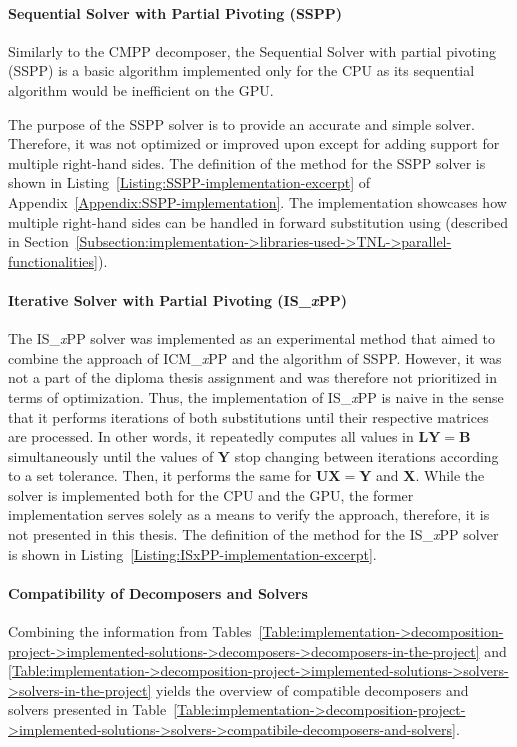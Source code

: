 \paragraph{Sequential Solver with Partial Pivoting (SSPP)}\label{Paragraph:implementation->decomposition-project->implemented-solutions->solvers->SSPP}
Similarly to the CMPP decomposer, the Sequential Solver with partial pivoting (SSPP) is a basic algorithm implemented only for the CPU as its sequential algorithm would be inefficient on the GPU.

The purpose of the SSPP solver is to provide an accurate and simple solver.
Therefore, it was not optimized or improved upon except for adding support for multiple right-hand sides.
The definition of the  method for the SSPP solver is shown in Listing~\ref{Listing:SSPP-implementation-excerpt} of Appendix~\ref{Appendix:SSPP-implementation}.
The implementation showcases how multiple right-hand sides can be handled in forward substitution using  (described in Section~\ref{Subsection:implementation->libraries-used->TNL->parallel-functionalities}).

\paragraph{Iterative Solver with Partial Pivoting (IS\_\textit{x}PP)}\label{Paragraph:implementation->decomposition-project->implemented-solutions->solvers->ISxPP}
The IS\_\textit{x}PP solver was implemented as an experimental method that aimed to combine the approach of ICM\_\textit{x}PP and the algorithm of SSPP.
However, it was not a part of the diploma thesis assignment and was therefore not prioritized in terms of optimization.
Thus, the implementation of IS\_\textit{x}PP is naive in the sense that it performs iterations of both substitutions until their respective matrices are processed.
In other words, it repeatedly computes all values in $\mathbf{LY} = \mathbf{B}$ simultaneously until the values of $\mathbf{Y}$ stop changing between iterations according to a set tolerance.
Then, it performs the same for $\mathbf{UX} = \mathbf{Y}$ and $\mathbf{X}$.
While the solver is implemented both for the CPU and the GPU, the former implementation serves solely as a means to verify the approach, therefore, it is not presented in this thesis.
The definition of the  method for the IS\_\textit{x}PP solver is shown in Listing~\ref{Listing:ISxPP-implementation-excerpt}.

\paragraph{Compatibility of Decomposers and Solvers} Combining the information from Tables~\ref{Table:implementation->decomposition-project->implemented-solutions->decomposers->decomposers-in-the-project} and \ref{Table:implementation->decomposition-project->implemented-solutions->solvers->solvers-in-the-project} yields the overview of compatible decomposers and solvers presented in Table~\ref{Table:implementation->decomposition-project->implemented-solutions->solvers->compatibile-decomposers-and-solvers}.

